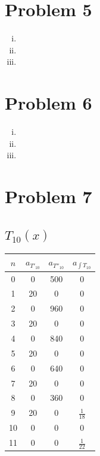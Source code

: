 \documentclass[11pt]{article} %
\begin{document}


\section*{Problem 5}
\begin{enumerate}[i.)]
\item
\item
\item
\end{enumerate}




\section*{Problem 6}
\begin{enumerate}[i.)]
\item
\item
\item
\end{enumerate}





\section*{Problem 7}
\subsection*{$T_{10}(x)$}

\begin{tabular}{| c | c | c | c |}
\hline 
$n$ & $a_{T'_{10}}$ & $a_{T''_{10}}$ & $a_{\int T_{10}}$ \\
\hline \hline
0 & 0 & 500 & 0\\
1 & 20 & 0 & 0\\
2 & 0& 960 & 0\\
3 & 20& 0& 0\\
4 & 0 & 840& 0\\
5 & 20 & 0 & 0\\
6 & 0 & 640 & 0\\
7 & 20 & 0 & 0\\
8 & 0 & 360 & 0\\
9 & 20 & 0 & $\frac{1}{18}$\\
10 & 0 & 0 & 0\\
11 &  0& 0& $\frac{1}{22}$\\
\hline
\end{tabular}
\end{document}
